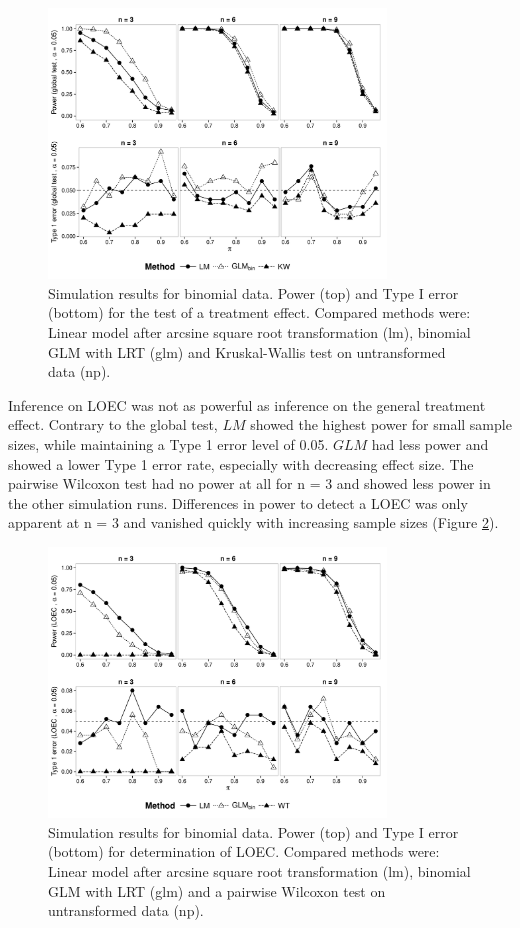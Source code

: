 \documentclass{scrartcl}
\begin{document}
\begin{figure}
  \centering
  \includegraphics[width = 0.8\textwidth]{p_glob_p.pdf}
  \caption{Simulation results for binomial data. Power (top) and Type I error (bottom) for the test of a treatment effect. Compared methods were: Linear model after arcsine square root transformation (lm), binomial GLM with LRT (glm) and Kruskal-Wallis test on untransformed data (np).}
  \label{fig:p_glob_p}
\end{figure}

Inference on LOEC was not as powerful as inference on the general treatment effect.
Contrary to the global test, $LM$ showed the highest power for small sample sizes, while maintaining a Type 1 error level of 0.05.
$GLM$ had less power and showed a lower Type 1 error rate, especially with decreasing effect size.
The pairwise Wilcoxon test had no power at all for n = 3 and showed less power in the other simulation runs.
Differences in power to detect a LOEC was only apparent at n = 3 and vanished quickly with increasing sample sizes (Figure \ref{fig:p_loec_p}). 

\begin{figure}
  \centering
  \includegraphics[width = 0.8\textwidth]{p_loec_p.pdf}
  \caption{Simulation results for binomial data. Power (top) and Type I error (bottom) for determination of LOEC. Compared methods were: Linear model after arcsine square root transformation (lm), binomial GLM with LRT (glm) and a pairwise Wilcoxon test on untransformed data (np).}
  \label{fig:p_loec_p}
\end{figure}
\end{document}
